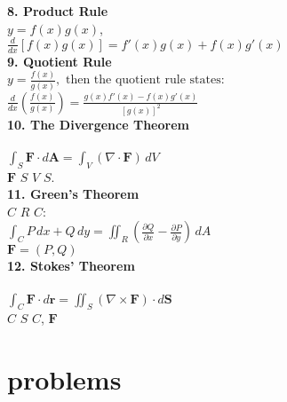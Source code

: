 \documentclass{article}
\begin{document}
\textbf{8. Product Rule} \\
 $y = f(x)g(x)$,   \\
$\frac{d}{dx}[f(x)g(x)] = f'(x)g(x) + f(x)g'(x)$  \\

\textbf{9. Quotient Rule} \\
 $y = \frac{f(x)}{g(x)}, \text{ then the quotient rule states:}$  \\
$\frac{d}{dx} \left( \frac{f(x)}{g(x)} \right) = \frac{g(x)f'(x) - f(x)g'(x)}{[g(x)]^2}$  \\

\textbf{10. The Divergence Theorem} \\
  \\
$\int_S \mathbf{F} \cdot d\mathbf{A} = \int_V (\nabla \cdot \mathbf{F}) \, dV$  \\
 $\mathbf{F}$  $S$  $V$  $S$.  \\

\textbf{11. Green's Theorem} \\
 $C$  $R$  $C$:  \\
$\int_C P \, dx + Q \, dy = \iint_R \left( \frac{\partial Q}{\partial x} - \frac{\partial P}{\partial y} \right) \, dA$  \\
 $\mathbf{F} = (P, Q)$   \\

\textbf{12. Stokes' Theorem} \\
  \\
$\int_C \mathbf{F} \cdot d\mathbf{r} = \iint_S (\nabla \times \mathbf{F}) \cdot d\mathbf{S}$  \\
 $C$  $S$  $C$,  $\mathbf{F}$   \\		
	
\newpage
\section*{problems}	
				
\end{document}
